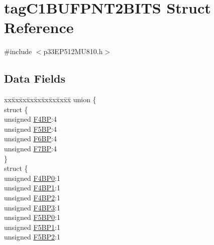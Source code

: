 \hypertarget{structtag_c1_b_u_f_p_n_t2_b_i_t_s}{}\section{tag\+C1\+B\+U\+F\+P\+N\+T2\+B\+I\+TS Struct Reference}
\label{structtag_c1_b_u_f_p_n_t2_b_i_t_s}


{\ttfamily \#include $<$p33\+E\+P512\+M\+U810.\+h$>$}

\subsection*{Data Fields}
\begin{DoxyCompactItemize}
\item 
\begin{tabbing}
xx\=xx\=xx\=xx\=xx\=xx\=xx\=xx\=xx\=\kill
union \{\\
\>struct \{\\
\>\>unsigned \hyperlink{structtag_c1_b_u_f_p_n_t2_b_i_t_s_a967992f3cc98d44367e080c4614b853f}{F4BP}:4\\
\>\>unsigned \hyperlink{structtag_c1_b_u_f_p_n_t2_b_i_t_s_ae2c878f927b220b50e83dae47a2240d5}{F5BP}:4\\
\>\>unsigned \hyperlink{structtag_c1_b_u_f_p_n_t2_b_i_t_s_a559a0c514d1efecd5bab3cf05c2f5999}{F6BP}:4\\
\>\>unsigned \hyperlink{structtag_c1_b_u_f_p_n_t2_b_i_t_s_a5f540f74101c21ce8be00f951eb7790b}{F7BP}:4\\
\>\} \\
\>struct \{\\
\>\>unsigned \hyperlink{structtag_c1_b_u_f_p_n_t2_b_i_t_s_ab96598b0d7fdfcf6278a850fc99796e8}{F4BP0}:1\\
\>\>unsigned \hyperlink{structtag_c1_b_u_f_p_n_t2_b_i_t_s_a75d84446c5fb6c126812f3adacd54847}{F4BP1}:1\\
\>\>unsigned \hyperlink{structtag_c1_b_u_f_p_n_t2_b_i_t_s_a2ca4c7010c5bd06bdc3c5829aa464284}{F4BP2}:1\\
\>\>unsigned \hyperlink{structtag_c1_b_u_f_p_n_t2_b_i_t_s_a83cb42cb8a89b2568afe99b8cc15a05f}{F4BP3}:1\\
\>\>unsigned \hyperlink{structtag_c1_b_u_f_p_n_t2_b_i_t_s_ac5aa8ee1d6b2a7b47831f1fee5b1bd09}{F5BP0}:1\\
\>\>unsigned \hyperlink{structtag_c1_b_u_f_p_n_t2_b_i_t_s_a23ca2a843318258593df11ca2fc7361f}{F5BP1}:1\\
\>\>unsigned \hyperlink{structtag_c1_b_u_f_p_n_t2_b_i_t_s_a49011c2c741be4d608ee20d2667241dd}{F5BP2}:1\\

\end{tabbing}
\end{DoxyCompactItemize}

